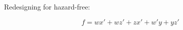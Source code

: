 \documentclass[12pt, a4paper]{article}
\begin{document}
	Redesigning for hazard-free:
	\begin{center}
	\end{center}
	$$f = wx' + wz' + zx' + w'y + yz'$$
	
\end{document}
